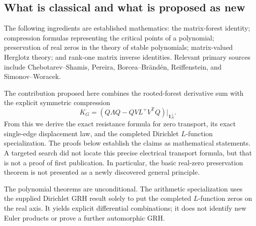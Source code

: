 \subsection{What is classical and what is proposed as new}

The following ingredients are established mathematics: the matrix-forest
identity; compression formulas representing the critical points of a
polynomial; preservation of real zeros in the theory of stable
polynomials; matrix-valued Herglotz theory; and rank-one matrix inverse
identities.  Relevant primary sources include Chebotarev--Shamis,
Pereira, Borcea--Br\"and\'en, Reiffenstein, and
Simonov--Woracek.\cite{forests,pereira,bb,reiffenstein,simonov}

The contribution proposed here combines the rooted-forest derivative sum
with the explicit symmetric compression
\[
 K_G=(Q\Lambda Q-QVL^+V^{\mathsf T}Q)|_{\boldsymbol1_N^\perp}.
\]
From this we derive the exact resistance formula for zero transport,
its exact single-edge displacement law, and the completed
Dirichlet $L$-function specialization.  The proofs below establish the
claims as mathematical statements.  A targeted search did not locate this
precise electrical transport formula, but that is not a proof of first
publication.  In particular, the basic real-zero preservation theorem is
not presented as a newly discovered general principle.

The polynomial theorems are unconditional.  The arithmetic specialization
uses the supplied Dirichlet GRH result solely to put the completed
$L$-function zeros on the real axis.  It yields explicit differential
combinations; it does not identify new Euler products or prove a further
automorphic GRH.

